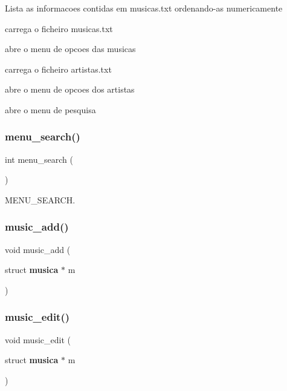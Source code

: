 Lista as informacoes contidas em musicas.\+txt ordenando-\/as numericamente

carrega o ficheiro musicas.\+txt

abre o menu de opcoes das musicas

carrega o ficheiro artistas.\+txt

abre o menu de opcoes dos artistas

abre o menu de pesquisa \mbox{\label{project_8h_a0fa77fad4bd4f6d18677cc1ab442172b}} 
\subsubsection{menu\_search()}
{\footnotesize\ttfamily int menu\+\_\+search (\begin{DoxyParamCaption}{ }\end{DoxyParamCaption})}



M\+E\+N\+U\+\_\+\+S\+E\+A\+R\+CH. 

\mbox{\label{project_8h_a0601269df7d88d6fe6b66fbbbdc589cb}} 
\subsubsection{music\_add()}
{\footnotesize\ttfamily void music\+\_\+add (\begin{DoxyParamCaption}\item[{struct \textbf{ musica} $\ast$}]{m }\end{DoxyParamCaption})}

\mbox{\label{project_8h_a86e0526889a472c55b6599489e04e164}} 
\subsubsection{music\_edit()}
{\footnotesize\ttfamily void music\+\_\+edit (\begin{DoxyParamCaption}\item[{struct \textbf{ musica} $\ast$}]{m }\end{DoxyParamCaption})}

\mbox{\label{project_8h_a3cde506a190f5edc6ccd1a9f92f00afc}} 
